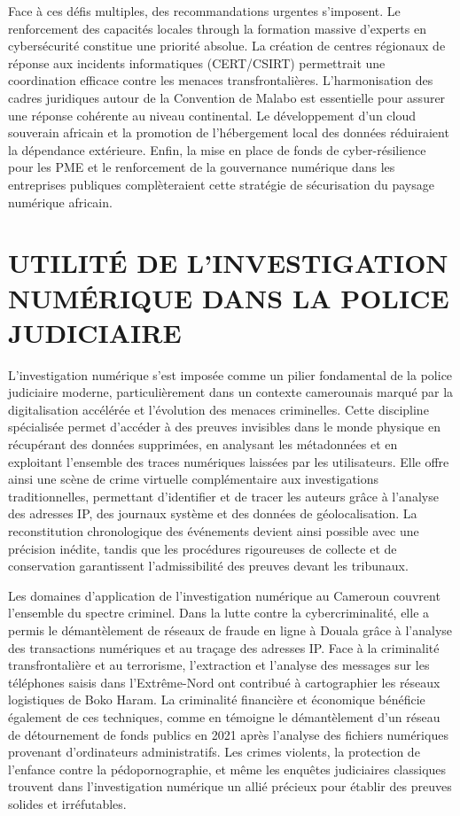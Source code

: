 \documentclass[12pt, a4paper]{article}
\begin{document}
		Face à ces défis multiples, des recommandations urgentes s'imposent. Le renforcement des capacités locales through la formation massive d'experts en cybersécurité constitue une priorité absolue. La création de centres régionaux de réponse aux incidents informatiques (CERT/CSIRT) permettrait une coordination efficace contre les menaces transfrontalières. L'harmonisation des cadres juridiques autour de la Convention de Malabo est essentielle pour assurer une réponse cohérente au niveau continental. Le développement d'un cloud souverain africain et la promotion de l'hébergement local des données réduiraient la dépendance extérieure. Enfin, la mise en place de fonds de cyber-résilience pour les PME et le renforcement de la gouvernance numérique dans les entreprises publiques complèteraient cette stratégie de sécurisation du paysage numérique africain.
		
		\section{UTILITÉ DE L'INVESTIGATION NUMÉRIQUE DANS LA POLICE JUDICIAIRE}
		
		L'investigation numérique s'est imposée comme un pilier fondamental de la police judiciaire moderne, particulièrement dans un contexte camerounais marqué par la digitalisation accélérée et l'évolution des menaces criminelles. Cette discipline spécialisée permet d'accéder à des preuves invisibles dans le monde physique en récupérant des données supprimées, en analysant les métadonnées et en exploitant l'ensemble des traces numériques laissées par les utilisateurs. Elle offre ainsi une scène de crime virtuelle complémentaire aux investigations traditionnelles, permettant d'identifier et de tracer les auteurs grâce à l'analyse des adresses IP, des journaux système et des données de géolocalisation. La reconstitution chronologique des événements devient ainsi possible avec une précision inédite, tandis que les procédures rigoureuses de collecte et de conservation garantissent l'admissibilité des preuves devant les tribunaux.
		
		Les domaines d'application de l'investigation numérique au Cameroun couvrent l'ensemble du spectre criminel. Dans la lutte contre la cybercriminalité, elle a permis le démantèlement de réseaux de fraude en ligne à Douala grâce à l'analyse des transactions numériques et au traçage des adresses IP. Face à la criminalité transfrontalière et au terrorisme, l'extraction et l'analyse des messages sur les téléphones saisis dans l'Extrême-Nord ont contribué à cartographier les réseaux logistiques de Boko Haram. La criminalité financière et économique bénéficie également de ces techniques, comme en témoigne le démantèlement d'un réseau de détournement de fonds publics en 2021 après l'analyse des fichiers numériques provenant d'ordinateurs administratifs. Les crimes violents, la protection de l'enfance contre la pédopornographie, et même les enquêtes judiciaires classiques trouvent dans l'investigation numérique un allié précieux pour établir des preuves solides et irréfutables.
		
\end{document}
